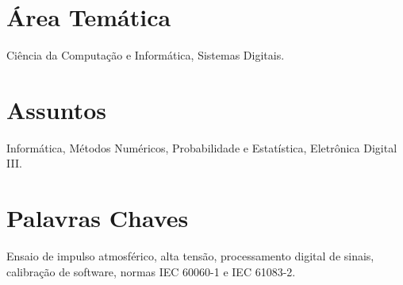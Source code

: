 \section*{Área Temática}
Ciência da Computação e Informática, Sistemas Digitais.
\vspace{11pt}

\section*{Assuntos}
Informática, Métodos Numéricos, Probabilidade e Estatística, Eletrônica Digital III.
\vspace{11pt}

\section*{Palavras Chaves}
Ensaio de impulso atmosférico, alta tensão, processamento digital de sinais, calibração de software, normas IEC 60060-1 e IEC 61083-2.
\vspace{11pt}